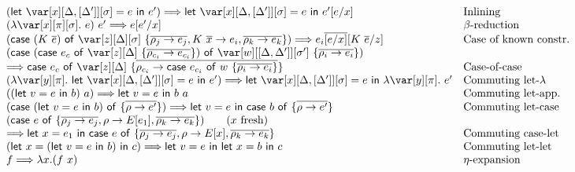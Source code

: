 \documentclass[acmsmall,review,anonymous,screen]{acmart}
\newcommand{\llet}[2]{\mathsf{let}~#1~\mathsf{in}~#2}
\newcommand{\ccase}[2]{\mathsf{case}~#1~\mathsf{of}~#2}
\begin{document}
\begin{figure}[t]

  {\small
  \[
    \begin{array}{ll}
   (\llet{\xD = e}{e'} )  \Longrightarrow \llet{\xD =       e}{e'[e/x]} &                    \mbox{Inlining}\\
       (\lambda \x[\pi][\s].~e)~e'  \Longrightarrow e[e'/x]  &                \mbox{$\beta$-reduction}\\
      (\ccase{(K~\ov{e})}{\z[\D][\s]~\{\overline{\rho_j\to e_j}, K~\ov{x} \to e_i, \overline{\rho_k\to e_k}\}} )\Longrightarrow  e_i\ov{[e/x]}[K~\ov{e}/z] &
                                  \mbox{Case of known constr.}\\
      (\ccase{(\ccase{e_c}{\z[\D]~\{\ov{\rho_{c_i}\to e_{c_i}}\}})}{\var[w][\irr{\D,\D'}][\s']~\{\ov{\rho_i\to e_i}\}})\\
            \Longrightarrow 
      \ccase{e_c}{\z[\D]~\{\ov{\rho_{c_i} \to \ccase{e_{c_i}}{w~\{\ov{\rho_i\to e_i}\}}}\}}
      & \mbox{Case-of-case}\\
      (\lambda \y[\pi].~\llet{\xD = e}{e'})
      \Longrightarrow
      \llet{\xD=e}{\lambda\y[\pi].~e'} & \mbox{Commuting let-$\lambda$}\\
      ((\llet{v = e}{b})~a) \Longrightarrow \llet{v = e}{b~a} &\mbox{Commuting let-app.}\\
      (\ccase{(\llet{v = e}{b})}{\{\overline{\rho\to e'}\}}) \Longrightarrow
      \llet{v =  e}{\ccase{b}{\{\overline{\rho\to e'}\}}}
                               &
                                 \mbox{Commuting let-case}\\
      (\ccase{e}{\{\overline{\rho_j\to e_j}, \rho \to E[e_1],
      \overline{\rho_k\to e_k}\}} ) \qquad (\mbox{$x$ fresh}) \\
     \Longrightarrow \llet{x = e_1}{\ccase{e}{\{\overline{\rho_j\to e_j}, \rho \to E[x], \overline{\rho_k\to e_k}\}}} 
                                                                        & \mbox{Commuting case-let}\\
      (\llet{x = (\llet{v = e}{b})}{c}) \Longrightarrow \llet{v = e}{\llet{x = b}{c}}
                                                                      & \mbox{Commuting let-let}\\
      f \Longrightarrow \lambda x.(f~x) & \mbox{$\eta$-expansion}\\

\end{array}\]}
\end{figure}
\end{document}
